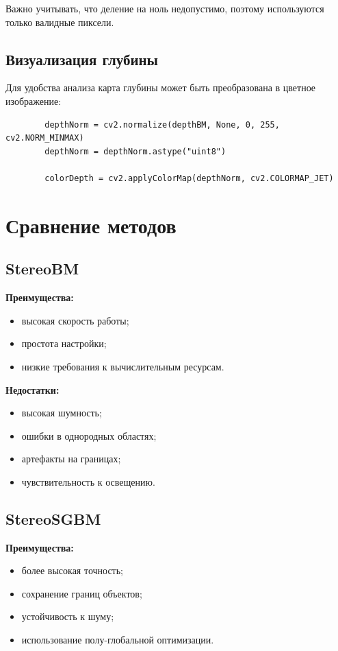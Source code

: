	Важно учитывать, что деление на ноль недопустимо, поэтому используются только валидные пиксели.
	
	\subsection{Визуализация глубины}
	
	Для удобства анализа карта глубины может быть преобразована в цветное изображение:
	
	\begin{lstlisting}
		depthNorm = cv2.normalize(depthBM, None, 0, 255, cv2.NORM_MINMAX)
		depthNorm = depthNorm.astype("uint8")
		
		colorDepth = cv2.applyColorMap(depthNorm, cv2.COLORMAP_JET)
	\end{lstlisting}
	
	\newpage{}
	
	\section{Сравнение методов}
	
	\subsection{StereoBM}
	
	\textbf{Преимущества:}
	\begin{itemize}
		\item высокая скорость работы;
		\item простота настройки;
		\item низкие требования к вычислительным ресурсам.
	\end{itemize}
	
	\textbf{Недостатки:}
	\begin{itemize}
		\item высокая шумность;
		\item ошибки в однородных областях;
		\item артефакты на границах;
		\item чувствительность к освещению.
	\end{itemize}
	
	\subsection{StereoSGBM}
	
	\textbf{Преимущества:}
	\begin{itemize}
		\item более высокая точность;
		\item сохранение границ объектов;
		\item устойчивость к шуму;
		\item использование полу-глобальной оптимизации.
	\end{itemize}
	
